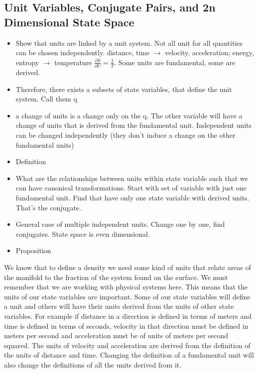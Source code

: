 \documentclass{article}
\begin{document}
\subsection{Unit Variables, Conjugate Pairs, and 2n Dimensional State Space}

\begin{itemize}
	\item Show that units are linked by a unit system. Not all unit for all quantities can be chosen independently. distance, time $\to$ velocity, acceleration; energy, entropy $\to$ temperature $\frac{\partial{S}}{\partial U} = \frac{1}{T}$. Some units are fundamental, some are derived.
	
	\item Therefore, there exists a subsets of state variables, that define the unit system. Call them q
	
	\item a change of units is a change only on the q.  The other variable will have a change of units that is derived from the fundamental unit. Independent units can be changed independently (they don't induce a change on the other fundamental units)
	
	\item Definition
	
	\item What are the relationships between units within state variable such that we can have canonical transformations. Start with set of variable with just one fundamental unit. Find that have only one state variable with derived units. That's the conjugate.
	
	\item General case of multiple independent units. Change one by one, find conjugates. State space is even dimensional.
	
	\item Proposition
	
\end{itemize}


	We know that to define a density we need some kind of units that relate areas of the manifold to the fraction of the system found on the surface. We must remember that we are working with physical systems here. This means that the units of our state variables are important. Some of our state variables will define a unit and others will have their units derived from the units of other state variables. For example if distance in a direction is defined in terms of meters and time is defined in terms of seconds, velocity in that direction must be defined in meters per second and acceleration must be of units of meters per second squared. The units of velocity and acceleration are derived from the definition of the units of distance and time. Changing the definition of a fundamental unit will also change the definitions of all the units derived from it. 
	
\end{document}
